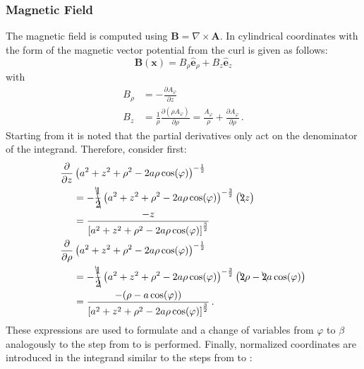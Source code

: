 \subsubsection{Magnetic Field}
The magnetic field is computed using $\mathbf{B} = \nabla \times \mathbf{A}$.
In cylindrical coordinates with the form of the magnetic vector potential from 
the curl is given as follows:
\begin{equation}
  \mathbf{B}(\mathbf{x})
= B_\rho \hat{\mathbf{e}}_\rho + B_z \hat{\mathbf{e}}_z
\end{equation}
with
\begin{align}
  B_\rho &= -                \frac{\partial       A_\varphi }{\partial z   }  \label{eqn:b_rho_start} \\
  B_z    &=   \frac{1}{\rho} \frac{\partial (\rho A_\varphi)}{\partial \rho}
          = \frac{A_\varphi}{\rho} + \frac{\partial A_\varphi}{\partial \rho} \label{eqn:b_z_start} \, .
\end{align}
Starting from  it is noted that the partial derivatives only act on the denominator of the integrand.
Therefore, consider first:
\begin{align}
  \frac{\partial}{\partial z}& \left( a^2 + z^2 + \rho^2 - 2 a \rho \cos(\varphi) \right)^{-\frac{1}{2}} \nonumber \\
  ~ &= - \bcancel{\frac{1}{2}} \left( a^2 + z^2 + \rho^2 - 2 a \rho \cos(\varphi) \right)^{-\frac{3}{2}} \left( \bcancel{2} z \right) \nonumber \\
  ~ &= \frac{- z}{\left[ a^2 + z^2 + \rho^2 - 2 a \rho \cos(\varphi) \right]^{\frac{3}{2}}} \\
  \frac{\partial}{\partial \rho}& \left( a^2 + z^2 + \rho^2 - 2 a \rho \cos(\varphi) \right)^{-\frac{1}{2}} \nonumber \\
  ~ &= - \bcancel{\frac{1}{2}} \left( a^2 + z^2 + \rho^2 - 2 a \rho \cos(\varphi) \right)^{-\frac{3}{2}} \left( \bcancel{2} \rho - \bcancel{2} a \cos(\varphi) \right) \nonumber \\
  ~ &= \frac{-(\rho - a \cos(\varphi))}{\left[ a^2 + z^2 + \rho^2 - 2 a \rho \cos(\varphi) \right]^{\frac{3}{2}}} \, .
\end{align}
These expressions are used to formulate  and
a change of variables from $\varphi$ to $\beta$ analogously to the step from  to  is performed.
Finally, normalized coordinates are introduced in the integrand similar to the steps from  to :
